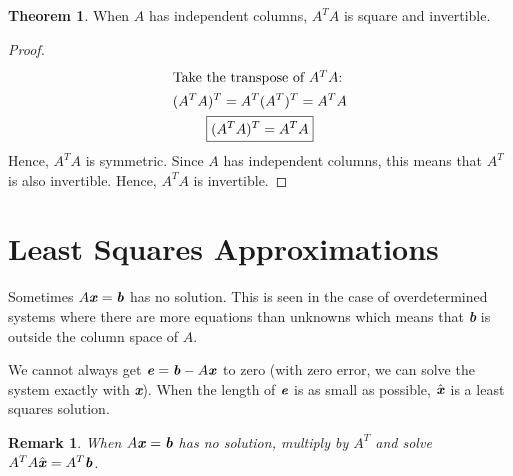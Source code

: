 \documentclass[12pt, letterpaper]{article}
\newcommand{\V}[1]{\textbf{\textit{#1}}}
\newcommand{\DefinitionSpace}{\vspace{15px}}
\newtheorem*{remark}{Remark}
\theoremstyle{definition}
\newtheorem{theorem}{Theorem}
\begin{document}
		\DefinitionSpace
		\begin{theorem}
			When $A$ has independent columns, $A^T A$ is square and invertible.
		\end{theorem}
		\begin{proof}
			\begin{gather*}
				\intertext{Take the transpose of $A^T A$:}
					(A^T A)^T = A^T (A^T)^T = A^T A \\
					\boxed{(A^T A)^T = A^T A}
			\end{gather*}
			Hence, $A^T A$ is symmetric. Since $A$ has independent columns, this means that $A^T$ is also invertible. Hence, $A^T A$ is invertible.
		\end{proof}



\section{Least Squares Approximations}
	Sometimes $A\V{x} = \V{b}$ has no solution. This is seen in the case of overdetermined systems where there are more equations than unknowns which means that \V{b} is outside the column space of $A$. 
	
	We cannot always get $\V{e} = \V{b} - A\V{x}$ to zero (with zero error, we can solve the system exactly with \V{x}). When the length of $\V{e}$ is as small as possible, $\hat{\V{x}}$ is a least squares solution. 
	
	\begin{remark}
		When $A\V{x} = \V{b}$ has no solution, multiply by $A^T$ and solve $A^T A \hat{\V{x}} = A^T \V{b}$.
	\end{remark}
\end{document}
